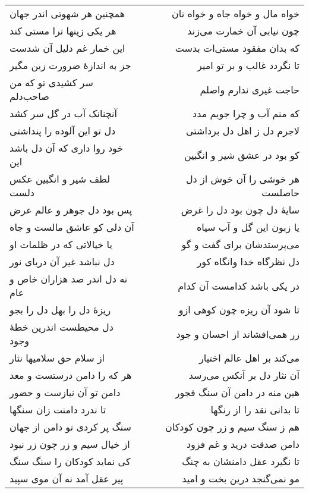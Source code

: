 \begin{center}
\begin{longtable}{l p{0.5cm} r}
\\
همچنین هر شهوتی اندر جهان
&&
خواه مال و خواه جاه و خواه نان
\\
هر یکی زینها ترا مستی کند
&&
چون نیابی آن خمارت می‌زند
\\
این خمار غم دلیل آن شدست
&&
که بدان مفقود مستی‌ات بدست
\\
جز به اندازهٔ ضرورت زین مگیر
&&
تا نگردد غالب و بر تو امیر
\\
سر کشیدی تو که من صاحب‌دلم
&&
حاجت غیری ندارم واصلم
\\
آنچنانک آب در گل سر کشد
&&
که منم آب و چرا جویم مدد
\\
دل تو این آلوده را پنداشتی
&&
لاجرم دل ز اهل دل برداشتی
\\
خود روا داری که آن دل باشد این
&&
کو بود در عشق شیر و انگبین
\\
لطف شیر و انگبین عکس دلست
&&
هر خوشی را آن خوش از دل حاصلست
\\
پس بود دل جوهر و عالم عرض
&&
سایهٔ دل چون بود دل را غرض
\\
آن دلی کو عاشق مالست و جاه
&&
یا زبون این گل و آب سیاه
\\
یا خیالاتی که در ظلمات او
&&
می‌پرستدشان برای گفت و گو
\\
دل نباشد غیر آن دریای نور
&&
دل نظرگاه خدا وانگاه کور
\\
نه دل اندر صد هزاران خاص و عام
&&
در یکی باشد کدامست آن کدام
\\
ریزهٔ دل را بهل دل را بجو
&&
تا شود آن ریزه چون کوهی ازو
\\
دل محیطست اندرین خطهٔ وجود
&&
زر همی‌افشاند از احسان و جود
\\
از سلام حق سلامیها نثار
&&
می‌کند بر اهل عالم اختیار
\\
هر که را دامن درستست و معد
&&
آن نثار دل بر آنکس می‌رسد
\\
دامن تو آن نیازست و حضور
&&
هین منه در دامن آن سنگ فجور
\\
تا ندرد دامنت زان سنگها
&&
تا بدانی نقد را از رنگها
\\
سنگ پر کردی تو دامن از جهان
&&
هم ز سنگ سیم و زر چون کودکان
\\
از خیال سیم و زر چون زر نبود
&&
دامن صدقت درید و غم فزود
\\
کی نماید کودکان را سنگ سنگ
&&
تا نگیرد عقل دامنشان به چنگ
\\
پیر عقل آمد نه آن موی سپید
&&
مو نمی‌گنجد درین بخت و امید
\\
\end{longtable}
\end{center}
